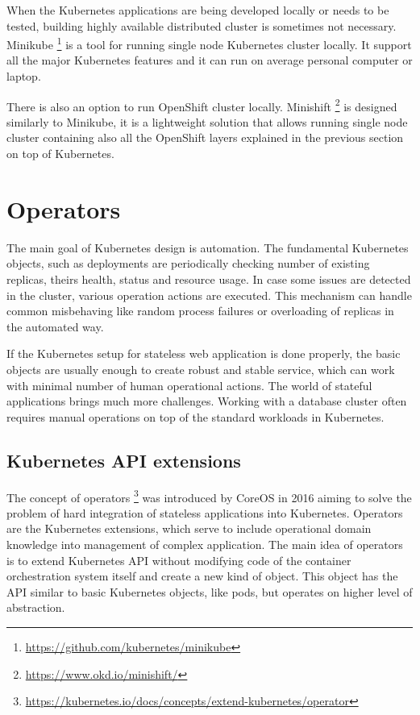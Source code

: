 \documentclass[
  digital, %
  twoside, %
  table,   %
  lof,     %
  lot,     %
]{fithesis3}
\begin{document}
When the Kubernetes applications are being developed locally or needs to be tested, building highly available distributed cluster is sometimes not necessary. Minikube \footnote{\url{https://github.com/kubernetes/minikube}} is a tool for running single node Kubernetes cluster locally. It support all the major Kubernetes features and it can run on average personal computer or laptop.

There is also an option to run OpenShift cluster locally. Minishift \footnote{\url{https://www.okd.io/minishift/}} is designed similarly to Minikube, it is a lightweight solution that allows running single node cluster containing also all the OpenShift layers explained in the previous section on top of Kubernetes.

\section{Operators} \label{sec:operators}
The main goal of Kubernetes design is automation. The fundamental Kubernetes objects, such as deployments are periodically checking number of existing replicas, theirs health, status and resource usage. In case some issues are detected in the cluster, various operation actions are executed. This mechanism can handle common misbehaving like random process failures or overloading of replicas in the automated way.

If the Kubernetes setup for stateless web application is done properly, the basic objects are usually enough to create robust and stable service, which can work with minimal number of human operational actions. The world of stateful applications brings much more challenges. Working with a database cluster often requires manual operations on top of the standard workloads in Kubernetes.

\subsection{Kubernetes API extensions}
The concept of operators \footnote{\url{https://kubernetes.io/docs/concepts/extend-kubernetes/operator}} was introduced by CoreOS \cite{operators} in 2016 aiming to solve the problem of hard integration of stateless applications into Kubernetes. Operators  are the Kubernetes extensions, which serve to include operational domain knowledge into management of complex application. The main idea of operators is to extend Kubernetes API without modifying code of the container orchestration system itself and create a new kind of object. This object has the API similar to basic Kubernetes objects, like pods, but operates on higher level of abstraction.
\end{document}
